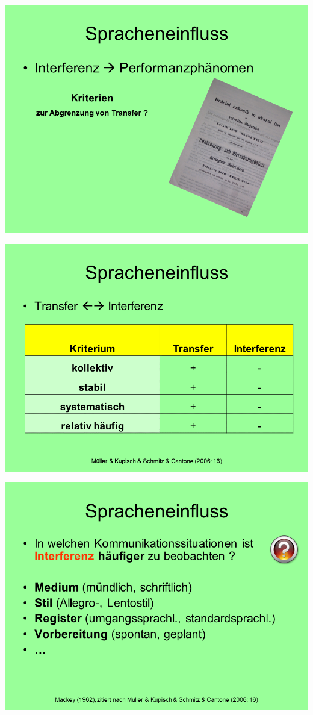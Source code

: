 \documentclass[
  letterpaper,
]{scrbook}
\begin{document}
\includegraphics[width=1\textwidth,height=\textheight]{./pictures/02_Spracheneinfluss_Sprachentrennung/Diapozitiv17.PNG}

\includegraphics[width=1\textwidth,height=\textheight]{./pictures/02_Spracheneinfluss_Sprachentrennung/Diapozitiv18.PNG}

\includegraphics[width=1\textwidth,height=\textheight]{./pictures/02_Spracheneinfluss_Sprachentrennung/Diapozitiv19.PNG}
\end{document}
